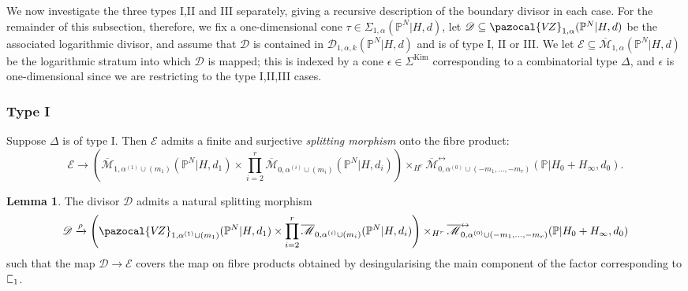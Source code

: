\documentclass[11pt]{amsart}
\newcommand{\sqC}{\scalebox{0.8}[1.3]{$\sqsubset$}}
\newcommand{\Kim}{\operatorname{Kim}}
\newcommand{\PP}{\mathbb P}
\newcommand{\VZ}{\pazocal{V\!Z}}
\renewcommand{\to}{\rightarrow}
\newcommand{\Mcal}{\mathcal{M}}
\newcommand{\Dcal}{\mathcal{D}}
\newcommand{\Ecal}{\mathcal{E}}
\newcommand{\ol}[1]{\overline{#1}}
\theoremstyle{definition}
\newtheorem{lemma}[thm]{Lemma}
\theoremstyle{definition}
\begin{document}
We now investigate the three types I,II and III separately, giving a recursive description of the boundary divisor in each case. For the remainder of this subsection, therefore, we fix a one-dimensional cone $\tau \in \Sigma_{1,\alpha}(\PP^N|H,d)$, let $\Dcal \subseteq \VZ_{1,\alpha}(\PP^N|H,d)$ be the associated logarithmic divisor, and assume that $\Dcal$ is contained in $\Dcal_{1,\alpha,k}(\PP^N|H,d)$ and is of type I, II or III. We let $\Ecal \subseteq \ol\Mcal_{1,\alpha}(\PP^N|H,d)$ be the logarithmic stratum into which $\Dcal$ is mapped; this is indexed by a cone $\epsilon \in \Sigma^{\Kim}$ corresponding to a combinatorial type $\Delta$, and $\epsilon$ is one-dimensional since we are restricting to the type I,II,III cases.


\subsubsection{Type I}\label{subsubsection type A} Suppose $\Delta$ is of type I. Then $\Ecal$ admits a finite and surjective \textit{splitting morphism} onto the fibre product:
\begin{equation*} \Ecal \to \left( \ol\Mcal_{1,\alpha^{(1)}\cup(m_1)}(\PP^N|H,d_1) \times \prod_{i=2}^r \ol\Mcal_{0,\alpha^{(i)}\cup(m_i)}(\PP^N|H,d_i) \right) \times_{H^r} \ol\Mcal^{\leftrightarrow}_{0,\alpha^{(0)}\cup (-m_1,\ldots,-m_r)}(\mathbb{P}|H_0+H_\infty,d_0).\end{equation*}

\begin{lemma} \label{Lemma type A gluing} The divisor $\Dcal$ admits a natural splitting morphism
\begin{equation*}\Dcal \xrightarrow{\rho} \left(\VZ_{1,\alpha^{(1)}\cup(m_1)}(\PP^N|H,d_1)\times\prod_{i=2}^r \ol\Mcal_{0,\alpha^{(i)}\cup(m_i)}(\PP^N|H,d_i)\right) \times_{H^r} \ol\Mcal^{\leftrightarrow}_{0,\alpha^{(0)}\cup (-m_1,\ldots,-m_r)}(\mathbb{P}|H_0+H_\infty,d_0)\end{equation*}
such that the map $\Dcal \to \Ecal$ covers the map on fibre products obtained by desingularising the main component of the factor corresponding to $\sqC_1$.\end{lemma}
\end{document}
